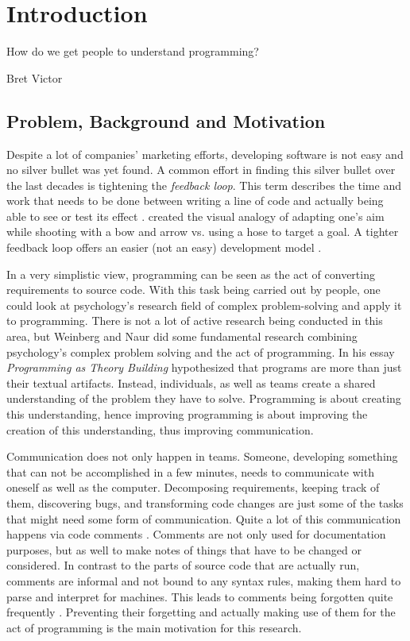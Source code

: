 \chapter{Introduction }
\epigraph{How do we get people to understand programming?}{Bret Victor}

\section{Problem, Background and Motivation}
Despite a lot of companies' marketing efforts, developing software is not easy and no silver bullet was yet found.
A common effort in finding this silver bullet over the last decades is tightening the \emph{feedback loop}.
This term describes the time and work that needs to be done between writing a line of code and actually being able to see or test its effect \cite{Aguiar.etal:2019}.
\citet{Aguiar.etal:2019} created the visual analogy of adapting one's aim while shooting with a bow and arrow vs. using a hose to target a goal.
A tighter feedback loop offers an easier (not an easy) development model \cite{Church.etal:2010}.

In a very simplistic view, programming can be seen as the act of converting requirements to source code.
With this task being carried out by people, one could look at psychology's research field of complex problem-solving and apply it to programming.
There is not a lot of active research being conducted in this area, but Weinberg \cite{Weinberg:1971} and Naur \cite{Naur:1985} did some fundamental research combining psychology's complex problem solving and the act of programming.
In his essay \emph{Programming as Theory Building} \citet{Naur:1985} hypothesized that programs are more than just their textual artifacts.
Instead, individuals, as well as teams create a shared understanding of the problem they have to solve.
Programming is about creating this understanding, hence improving programming is about improving the creation of this understanding, thus improving communication.

Communication does not only happen in teams.
Someone, developing something that can not be accomplished in a few minutes, needs to communicate with oneself as well as the computer.
Decomposing requirements, keeping track of them, discovering bugs, and transforming code changes are just some of the tasks that might need some form of communication.
Quite a lot of this communication happens via code comments \cite{Ying.etal:2005}.
Comments are not only used for documentation purposes, but as well to make notes of things that have to be changed or considered.
In contrast to the parts of source code that are actually run, comments are informal and not bound to any syntax rules, making them hard to parse and interpret for machines.
This leads to comments being forgotten quite frequently \cite{Nie.etal:2019}.
Preventing their forgetting and actually making use of them for the act of programming is the main motivation for this research.

